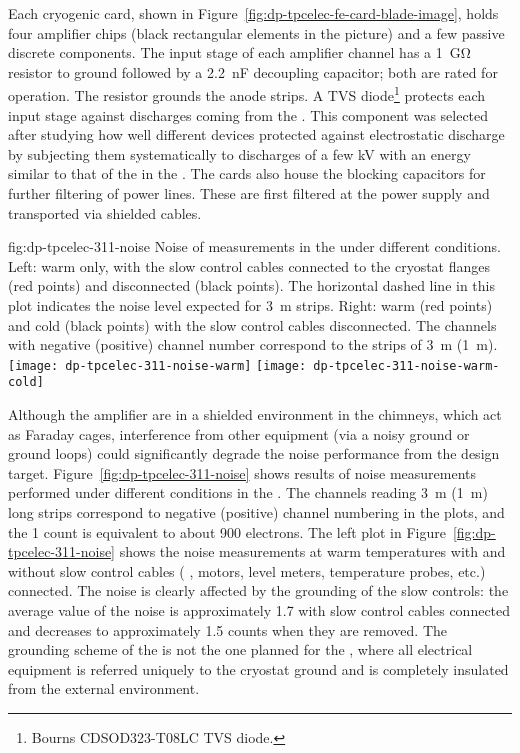 Each cryogenic  card, shown in Figure~\ref{fig:dp-tpcelec-fe-card-blade-image}, holds four  amplifier chips (black rectangular elements in the picture) and a few passive discrete components. The input stage of each amplifier channel has a \SI{1}{\giga\ohm} resistor to ground followed by a \SI{2.2}{\nano\farad} decoupling capacitor; both are rated for  operation. The %
resistor grounds the  anode strips. A TVS diode\footnote{Bourns\texttrademark{} CDSOD323-T08LC TVS diode.} protects each input stage against discharges coming from the . This component was selected after studying how well different devices protected against electrostatic discharge by subjecting them systematically to discharges of a few \si{kV} with an energy similar to that of the  in the . The  cards also house the blocking capacitors for further filtering of  power lines. These are first filtered at the power supply and transported via shielded cables.


\begin{dunefigure}{fig:dp-tpcelec-311-noise}
{Noise of measurements in the  under different conditions. Left: warm only,  with the slow control cables connected to the cryostat flanges (red points) and disconnected (black points). The horizontal dashed line in this plot indicates the noise level expected for \SI{3}{\meter} strips. Right: warm (red points) and cold (black points) with the slow control cables disconnected. The channels with negative (positive) channel number correspond to the strips of \SI{3}{\meter} (\SI{1}{\meter}).}
\texttt{[image: dp-tpcelec-311-noise-warm]}
\texttt{[image: dp-tpcelec-311-noise-warm-cold]}
\end{dunefigure}


Although the  amplifier  are in a shielded environment in the chimneys, which act as Faraday cages, interference from other equipment (via a noisy ground or ground loops) could significantly degrade %
the noise performance from the design target. Figure~\ref{fig:dp-tpcelec-311-noise} shows results of noise measurements performed under different conditions in the . The channels reading \SI{3}{\meter} (\SI{1}{\metre}) long strips correspond to negative (positive) channel numbering in the plots, and the \num{1}  count is equivalent to about \num{900} electrons. The left plot in Figure~\ref{fig:dp-tpcelec-311-noise} shows the noise measurements at warm temperatures with and without slow control cables ( ,  motors, level meters, temperature probes, etc.) connected. The noise is clearly affected by the grounding of the slow controls: the average value of the noise \rms is approximately \num{1.7}  with slow control cables connected and decreases to approximately \num{1.5}  counts when they are removed. The grounding scheme of the  is not the one planned for the , where all electrical equipment is referred uniquely to the cryostat ground and is completely insulated from the external environment. 

